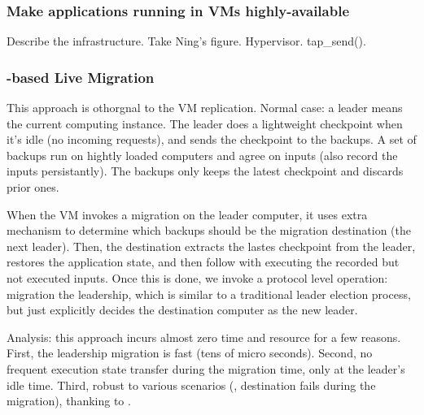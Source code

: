 \vspace{-.15in}\subsubsection{Make applications running in VMs 
highly-available} 
\label{sec:defense-arch}\vspace{-.075in}

Describe the infrastructure. Take Ning's figure. Hypervisor. tap\_send().

\vspace{-.15in}\subsubsection{\paxos-based Live Migration} 
\label{sec:defense-arch}\vspace{-.075in}



This approach is othorgnal to the VM replication. Normal case: a leader means 
the current computing instance. The leader does a lightweight checkpoint when 
it's idle (no incoming requests), and sends the checkpoint to the backups. A 
set of backups run on hightly loaded computers and agree on inputs (also record 
the inputs persistantly). The backups only keeps the latest checkpoint and 
discards prior ones.

When the VM invokes a migration on the leader computer, it uses extra mechanism 
to determine which backups should be the migration destination (the next 
leader). Then, the destination extracts the lastes checkpoint from the leader, 
restores the application state, and then follow with executing the recorded but 
not executed inputs. Once this is done, we invoke a \falcon protocol 
level operation: migration the leadership, which is similar to a traditional 
\paxos leader election process, but just explicitly decides the destination 
computer as the new leader.

Analysis: this approach incurs almost zero time and resource for a few reasons. 
First, the leadership migration is fast (tens of micro seconds). Second, no 
frequent execution state transfer during the migration time, only at the 
leader's idle time. Third, robust to various scenarios (\eg, destination fails 
during the migration), thanking to \paxos.

